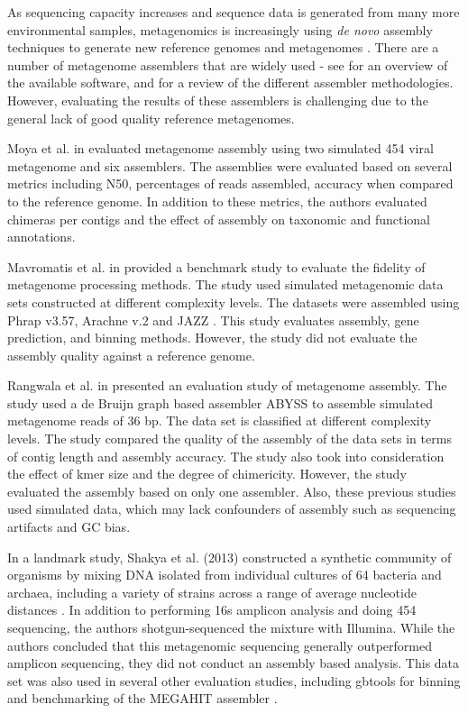 \documentclass[11pt]{article}
\begin{document}
As sequencing capacity increases and sequence data is generated from
many more environmental samples, metagenomics is increasingly using
{\em de novo} assembly techniques to generate new reference genomes
and metagenomes \cite{Sharon2012}.  There are a number of metagenome
assemblers that are widely used - see \cite{Vollmers2017} for an
overview of the available software, and \cite{ghurye2016metagenomic}
for a review of the different assembler methodologies. However,
evaluating the results of these assemblers is challenging due to the
general lack of good quality reference metagenomes.


Moya et al. in \cite{moya2014} evaluated metagenome assembly using two
simulated 454 viral metagenome and six assemblers. The assemblies were
evaluated based on several metrics including N50, percentages of reads
assembled, accuracy when compared to the reference genome. In addition
to these metrics, the authors evaluated chimeras per contigs and the
effect of assembly on taxonomic and functional annotations.
 
Mavromatis et al. in \cite{mavromatis2007} provided a benchmark study
to evaluate the fidelity of metagenome processing methods. The study used
simulated metagenomic data sets constructed at different complexity
levels.
The datasets were assembled using Phrap v3.57, Arachne v.2
\cite{arachne} and JAZZ \cite{jazz}.
This study evaluates assembly, gene prediction, and binning
methods. However, the study did not evaluate the assembly quality
against a reference genome.

Rangwala et al. in \cite{huzefa2011} presented an evaluation study of
metagenome assembly. The study used a de Bruijn graph based assembler
ABYSS \cite{abyss} to assemble simulated metagenome reads of 36 bp. The
data set is classified at different complexity levels.  The study
compared the quality of the assembly of the data sets in terms of
contig length and assembly accuracy. The study also took into
consideration the effect of kmer size and the degree of chimericity.
However, the study evaluated the assembly based on only one
assembler. Also, these previous studies used simulated data, which may
lack confounders of assembly such as sequencing artifacts and GC bias.

In a landmark study, Shakya et al. (2013) constructed a synthetic
community of organisms by mixing DNA isolated from individual cultures
of 64 bacteria and archaea, including a variety of strains across a
range of average nucleotide distances \cite{podar}.  In addition to performing
16s amplicon analysis and doing 454 sequencing, the authors
shotgun-sequenced the mixture with Illumina.  While the authors
concluded that this metagenomic sequencing generally outperformed
amplicon sequencing, they did not conduct an assembly based analysis.
This data set was also used in several other evaluation studies,
including gbtools for binning \cite{Seah2015} and benchmarking of the
MEGAHIT assembler \cite{Li2016}.
\end{document}
